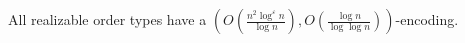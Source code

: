 \begin{contribution}[label=thm:realizable-loglog,restate=TheoremGPTRealizableLogLog]
  All realizable order types have a
  \((O(\frac{n^2\log^\varepsilon n}{\log n}),
  O(\frac{\log{n}}{\log{\log{n}}}))\)-encoding.
\end{contribution}
